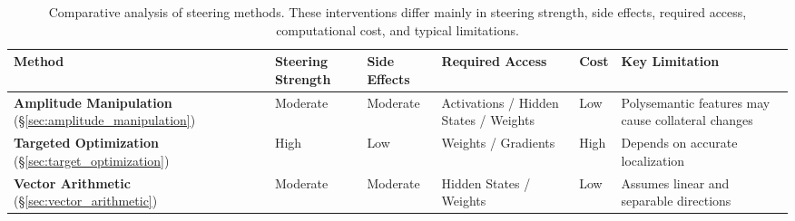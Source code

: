 \begin{table}[!t]
    \centering
    \caption{Comparative analysis of steering methods. These interventions differ mainly in steering strength, side effects, required access, computational cost, and typical limitations.}
    \label{tab:steering_methods_comparison}
    \small
    \setlength{\tabcolsep}{3pt}
    \renewcommand{\arraystretch}{1.1}
    \begin{tabular}{L{0.27\textwidth} L{0.10\textwidth} L{0.11\textwidth} L{0.18\textwidth} L{0.08\textwidth} L{0.18\textwidth}}
    \toprule[1.3pt]
    \textbf{Method} & \textbf{Steering Strength} & \textbf{Side Effects} & \textbf{Required Access} & \textbf{Cost} & \textbf{Key Limitation} \\
    \midrule
    \textbf{Amplitude Manipulation} (\S\ref{sec:amplitude_manipulation}) & Moderate & Moderate & Activations / Hidden States / Weights & Low & Polysemantic features may cause collateral changes \\
    \textbf{Targeted Optimization} (\S\ref{sec:target_optimization}) & High & Low & Weights / Gradients & High & Depends on accurate localization \\
    \textbf{Vector Arithmetic} (\S\ref{sec:vector_arithmetic}) & Moderate & Moderate & Hidden States / Weights & Low & Assumes linear and separable directions \\
    \bottomrule[1.3pt]
    \end{tabular}
    \end{table}